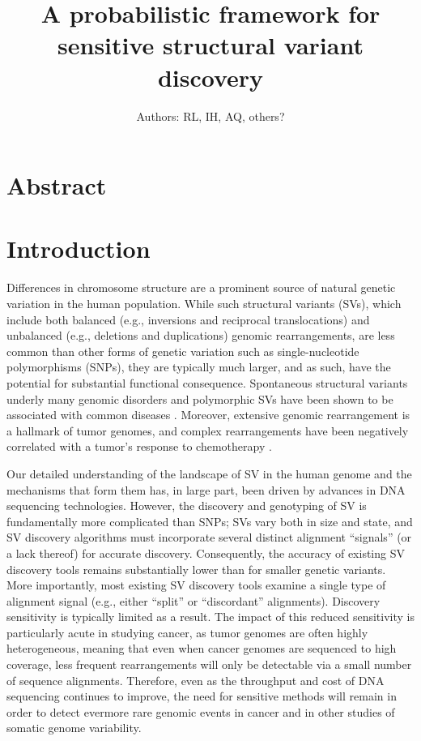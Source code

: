 \documentclass[11pt]{article}
\begin{document}
\title{A probabilistic framework for sensitive structural variant discovery}
\author{Authors: RL, IH, AQ, others?}
\maketitle


\section{Abstract}



\section{Introduction}

Differences in chromosome structure are a prominent source of natural 
genetic variation in the human population. While such structural variants (SVs),
which include both balanced (e.g., inversions and reciprocal translocations)
and unbalanced (e.g., deletions and duplications) genomic rearrangements, are 
less common than other forms of genetic variation such as single-nucleotide 
polymorphisms (SNPs), they are typically much larger, and as such, have the 
potential for substantial functional consequence. Spontaneous structural
variants underly many genomic disorders and polymorphic SVs have been shown to
be associated with common diseases \cite{McCarroll2008}. Moreover, extensive
genomic rearrangement is a hallmark of tumor genomes, and complex rearrangements
have been negatively correlated with a tumor's response to chemotherapy
\cite{Rausch2012}.

Our detailed understanding of the landscape of SV in the human genome and the
mechanisms that form them has, in large part, been driven by advances in DNA
sequencing technologies. However, the discovery and genotyping of SV is 
fundamentally more complicated than SNPs; SVs vary both in size and state, 
and SV discovery algorithms must incorporate several distinct alignment 
``signals'' (or a lack thereof) for accurate discovery. Consequently, the
accuracy of existing SV discovery tools remains substantially lower than for
smaller genetic variants. More importantly, most existing SV discovery
tools examine a single type of alignment signal (e.g., either ``split'' or 
``discordant'' alignments). Discovery sensitivity is typically limited as a 
result. The impact of this reduced sensitivity is particularly acute in studying 
cancer, as tumor genomes are often highly heterogeneous, meaning that even 
when cancer genomes are sequenced to high coverage, less frequent rearrangements 
will only be detectable via a small number of sequence alignments. Therefore,
even as the throughput and cost of DNA sequencing continues to improve, the
need for sensitive methods will remain in order to detect evermore rare
genomic events in cancer and in other studies of somatic genome variability.
\end{document}
